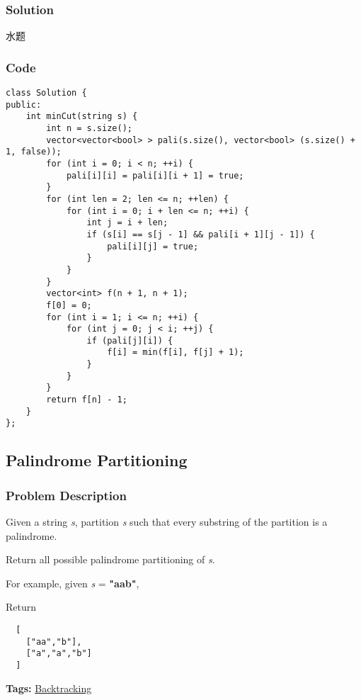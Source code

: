 \documentclass{article}
\begin{document}
\begin{CJK*}{UTF8}{gkai}

\subsubsection*{Solution}
水题

\subsubsection*{Code}
\begin{lstlisting}
class Solution {
public:
    int minCut(string s) {
        int n = s.size();
        vector<vector<bool> > pali(s.size(), vector<bool> (s.size() + 1, false));
        for (int i = 0; i < n; ++i) {
            pali[i][i] = pali[i][i + 1] = true;
        }
        for (int len = 2; len <= n; ++len) {
            for (int i = 0; i + len <= n; ++i) {
                int j = i + len;
                if (s[i] == s[j - 1] && pali[i + 1][j - 1]) {
                    pali[i][j] = true;
                }
            }
        }
        vector<int> f(n + 1, n + 1);
        f[0] = 0;
        for (int i = 1; i <= n; ++i) {
            for (int j = 0; j < i; ++j) {
                if (pali[j][i]) {
                    f[i] = min(f[i], f[j] + 1);
                }
            }
        }
        return f[n] - 1;
    }
}; 
\end{lstlisting}


\subsection{ Palindrome Partitioning }
\label{ Palindrome Partitioning }

\subsubsection*{Problem Description}
Given a string \emph{s}, partition \emph{s} such that every substring of the partition is a palindrome.

Return all possible palindrome partitioning of \emph{s}.

For example, given \emph{s} = \textbf{"aab"},



Return
\begin{verbatim}
  [
    ["aa","b"],
    ["a","a","b"]
  ]
\end{verbatim}


\textbf{Tags: }
\hyperref[ Backtracking ]{ Backtracking }



\end{CJK*}
\end{document}
